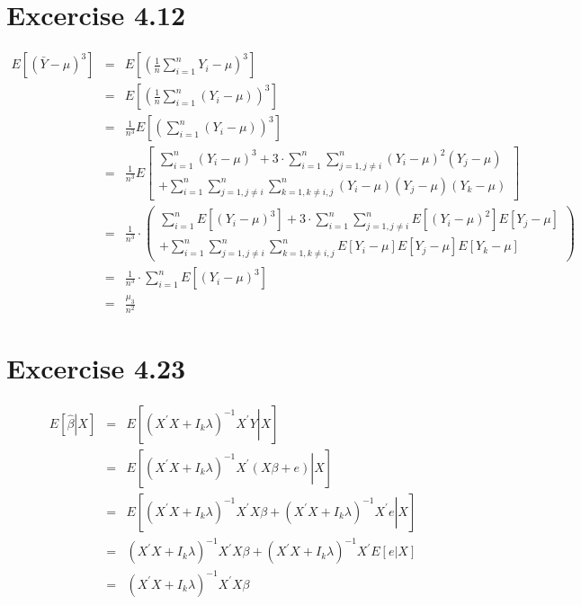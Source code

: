 \documentclass{article}
\begin{document}
\section*{Excercise 4.12}

\begin{eqnarray*}
E\left[ \left( \bar{Y}-\mu \right) ^{3}\right] &=&E\left[ \left( \frac{1}{n}%
\sum_{i=1}^{n}Y_{i}-\mu \right) ^{3}\right] \\
&=&E\left[ \left( \frac{1}{n}\sum_{i=1}^{n}\left( Y_{i}-\mu \right) \right)
^{3}\right] \\
&=&\frac{1}{n^{3}}E\left[ \left( \sum_{i=1}^{n}\left( Y_{i}-\mu \right)
\right) ^{3}\right] \\
&=&\frac{1}{n^{3}}E\left[ 
\begin{array}{c}
\sum_{i=1}^{n}\left( Y_{i}-\mu \right) ^{3}+3\cdot
\sum_{i=1}^{n}\sum_{j=1,j\neq i}^{n}\left( Y_{i}-\mu \right) ^{2}\left(
Y_{j}-\mu \right) \\ 
+\sum_{i=1}^{n}\sum_{j=1,j\neq i}^{n}\sum_{k=1,k\neq i,j}^{n}\left(
Y_{i}-\mu \right) \left( Y_{j}-\mu \right) \left( Y_{k}-\mu \right)%
\end{array}%
\right] \\
&=&\frac{1}{n^{3}}\cdot \left( 
\begin{array}{c}
\sum_{i=1}^{n}E\left[ \left( Y_{i}-\mu \right) ^{3}\right] +3\cdot
\sum_{i=1}^{n}\sum_{j=1,j\neq i}^{n}E\left[ \left( Y_{i}-\mu \right) ^{2}%
\right] E\left[ Y_{j}-\mu \right] \\ 
+\sum_{i=1}^{n}\sum_{j=1,j\neq i}^{n}\sum_{k=1,k\neq i,j}^{n}E\left[
Y_{i}-\mu \right] E\left[ Y_{j}-\mu \right] E\left[ Y_{k}-\mu \right]%
\end{array}%
\right) \\
&=&\frac{1}{n^{3}}\cdot \sum_{i=1}^{n}E\left[ \left( Y_{i}-\mu \right) ^{3}%
\right] \\
&=&\frac{\mu _{3}}{n^{2}}
\end{eqnarray*}

\section*{Excercise 4.23}

\begin{eqnarray*}
E\left[ \left. \hat{\beta}\right\vert X\right] &=&E\left[ \left. \left(
X^{\prime }X+I_{k}\lambda \right) ^{-1}X^{\prime }Y\right\vert X\right] \\
&=&E\left[ \left. \left( X^{\prime }X+I_{k}\lambda \right) ^{-1}X^{\prime
}\left( X\beta +e\right) \right\vert X\right] \\
&=&E\left[ \left. \left( X^{\prime }X+I_{k}\lambda \right) ^{-1}X^{\prime
}X\beta +\left( X^{\prime }X+I_{k}\lambda \right) ^{-1}X^{\prime
}e\right\vert X\right] \\
&=&\left( X^{\prime }X+I_{k}\lambda \right) ^{-1}X^{\prime }X\beta +\left(
X^{\prime }X+I_{k}\lambda \right) ^{-1}X^{\prime }E\left[ \left.
e\right\vert X\right] \\
&=&\left( X^{\prime }X+I_{k}\lambda \right) ^{-1}X^{\prime }X\beta
\end{eqnarray*}
\end{document}
